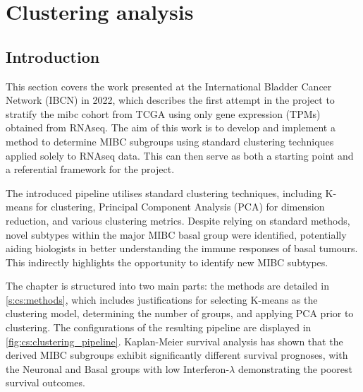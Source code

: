 \chapter{Clustering analysis} \label{s:clustering_analysis}

\vspace{3mm}
\vspace{3mm}

\section{Introduction}

This section covers the work presented at the International Bladder Cancer Network (IBCN) in 2022, which describes the first attempt in the project to stratify the \acrfull{mibc} cohort from TCGA using only gene expression (TPMs) obtained from RNAseq. The aim of this work is to develop and implement a method to determine MIBC subgroups using standard clustering techniques applied solely to RNAseq data. This can then serve as both a starting point and a referential framework for the project.

The introduced pipeline utilises standard clustering techniques, including K-means for clustering, Principal Component Analysis (PCA) for dimension reduction, and various clustering metrics. Despite relying on standard methods, novel subtypes within the major MIBC basal group were identified, potentially aiding biologists in better understanding the immune responses of basal tumours. This indirectly highlights the opportunity to identify new MIBC subtypes.

The chapter is structured into two main parts: the methods are detailed in \cref{s:cs:methods}, which includes justifications for selecting K-means as the clustering model, determining the number of groups, and applying PCA prior to clustering. The configurations of the resulting pipeline are displayed in \cref{fig:cs:clustering_pipeline}. Kaplan-Meier survival analysis has shown that the derived MIBC subgroups exhibit significantly different survival prognoses, with the Neuronal and Basal groups with low Interferon-$\lambda$ demonstrating the poorest survival outcomes.

